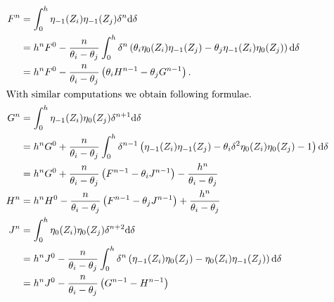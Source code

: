 \begin{align*}
  F^{n} & = \int_{0}^{h}\eta_{-1}(Z_i)\eta_{-1}(Z_j) \delta^{n} \dd \delta                                                                                    \\
        & =h^{n} F^0 - \frac{n}{\theta_i - \theta_j}\int_{0}^{h} \delta^{n} \left( \theta_i \eta_{0}(Z_i)\eta_{-1}(Z_j)
  - \theta_j \eta_{-1}(Z_i)\eta_{0}(Z_j) \right) \dd \delta                                                                                                   \\
        & =h^{n} F^0 - \frac{n}{\theta_i-\theta_j}\left(\theta_i H^{n-1} - \theta_j G^{n-1}\right) \text{.}                                                   \\
  \intertext{With similar computations we obtain following formulae.}
  G^{n} & = \int_{0}^{h}\eta_{-1}(Z_i)\eta_{0}(Z_j) \delta^{n+1} \dd \delta                                                                                   \\
        & = h^{n} G^0 + \frac{n}{\theta_i - \theta_j}\int_0^h \delta^{n-1} \left( \eta_{-1}(Z_i)\eta_{-1}(Z_j)
  - \theta_i\delta^2 \eta_{0}(Z_i)\eta_{0}(Z_j)  - 1 \right) \dd \delta                                                                                       \\
        & = h^{n} G^0 + \frac{n}{\theta_i - \theta_j}\left( F^{n-1} - \theta_i J^{n-1}\right) - \frac{h^{n}}{\theta_i - \theta_j}                             \\
  H^{n} & = h^{n} H^0 - \frac{n }{\theta_i - \theta_j}\left( F^{n-1} - \theta_j J^{n-1}\right) + \frac{h^{n}}{\theta_i - \theta_j}                            \\
  J^{n} & = \int_{0}^{h}\eta_{0}(Z_i)\eta_{0}(Z_j) \delta^{n+2} \dd \delta                                                                                    \\
        & = h^{n} J^0 - \frac{n }{\theta_i - \theta_j}\int_0^h \delta^{n} \left( \eta_{-1}(Z_i)\eta_{0}(Z_j) - \eta_{0}(Z_i)\eta_{-1}(Z_j) \right) \dd \delta \\
        & = h^{n} J^0 - \frac{n }{\theta_i - \theta_j}\left( G^{n-1} - H^{n-1} \right)
\end{align*}


